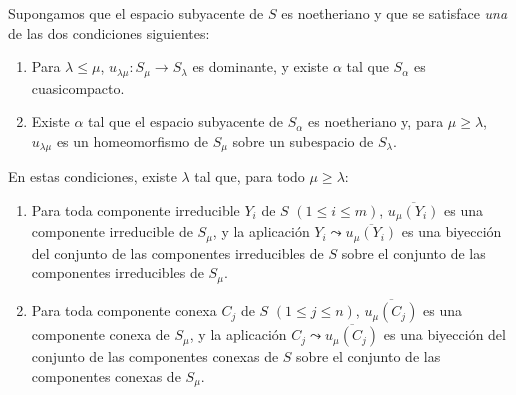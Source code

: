 \begin{proposition}[8.4.2]
\label{IV.8.4.2-fr}
Supongamos que el espacio subyacente de $S$ es noetheriano y que se satisface \emph{una} de las dos condiciones siguientes:
\begin{enumerate}[label=\emph{\alph*)}]
  \item Para $\lambda\leq\mu$, $u_{\lambda\mu}:S_\mu\to S_\lambda$ es dominante, y existe $\alpha$ tal que $S_\alpha$ es cuasicompacto.
  \item Existe $\alpha$ tal que el espacio subyacente de $S_\alpha$ es noetheriano y, para $\mu\geq\lambda$, $u_{\lambda\mu}$ es un homeomorfismo de $S_\mu$ sobre un subespacio de $S_\lambda$.
\end{enumerate}
En estas condiciones, existe $\lambda$ tal que, para todo $\mu\geq\lambda$:
\begin{enumerate}[label=\textup{(\roman*)}]
  \item Para toda componente irreducible $Y_i$ de $S$ $(1\leq i\leq m)$, $\overline{u_\mu(Y_i)}$ es una componente irreducible de $S_\mu$, y la aplicación $Y_i\leadsto\overline{u_\mu(Y_i)}$ es una biyección del conjunto de las componentes irreducibles de $S$ sobre el conjunto de las componentes irreducibles de $S_\mu$.
  \item Para toda componente conexa $C_j$ de $S$ $(1\leq j\leq n)$, $\overline{u_\mu(C_j)}$ es una componente conexa de $S_\mu$, y la aplicación $C_j\leadsto\overline{u_\mu(C_j)}$ es una biyección del conjunto de las componentes conexas de $S$ sobre el conjunto de las componentes conexas de $S_\mu$.
\end{enumerate}
\end{proposition}


